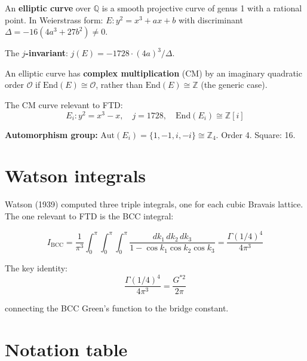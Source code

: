 \documentclass[
  11pt,
  letterpaper,
  twoside,
  openany]{book}
\makeatletter
\let\orig@section\section
\renewcommand{\section}{\needspace{8\baselineskip}\orig@section}
\newcommand{\Gssq}{G^{*2}{}}      %
\makeatother
\begin{document}
An \textbf{elliptic curve} over \(\mathbb{Q}\) is a smooth projective
curve of genus 1 with a rational point. In Weierstrass form:
\(E: y^2 = x^3 + ax + b\) with discriminant
\(\Delta = -16(4a^3 + 27b^2) \neq 0\).

The \textbf{\(j\)-invariant}: \(j(E) = -1728 \cdot (4a)^3 / \Delta\).

An elliptic curve has \textbf{complex multiplication} (CM) by an
imaginary quadratic order \(\mathcal{O}\) if
\(\text{End}(E) \cong \mathcal{O}\), rather than
\(\text{End}(E) \cong \mathbb{Z}\) (the generic case).

The CM curve relevant to FTD: \[
E_i: y^2 = x^3 - x, \quad j = 1728, \quad \text{End}(E_i) \cong \mathbb{Z}[i]
\tag{P.10}
\]

\textbf{Automorphism group:}
\(\text{Aut}(E_i) = \{1, -1, i, -i\} \cong \mathbb{Z}_4\). Order 4.
Square: 16.

\section{Watson integrals}\label{watson-integrals}

Watson (1939) computed three triple integrals, one for each cubic
Bravais lattice. The one relevant to FTD is the BCC integral:

\[
I_{\text{BCC}} = \frac{1}{\pi^3} \int_0^\pi \!\! \int_0^\pi \!\! \int_0^\pi \frac{dk_1 \, dk_2 \, dk_3}{1 - \cos k_1 \cos k_2 \cos k_3} = \frac{\Gamma(1/4)^4}{4\pi^3}
\tag{P.11}
\]

The key identity: \[
\frac{\Gamma(1/4)^4}{4\pi^3} = \frac{\Gssq}{2\pi}
\tag{P.12}
\]

connecting the BCC Green's function to the bridge constant.

\section{Notation table}\label{notation-table}
\end{document}
